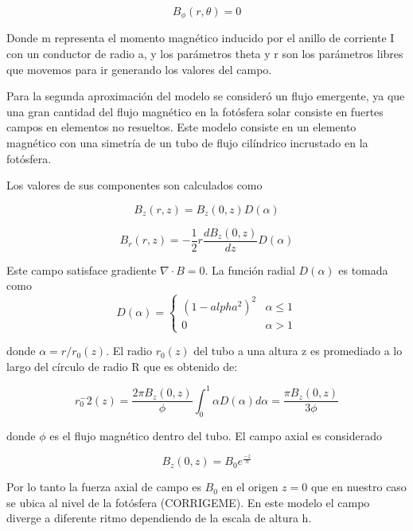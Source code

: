 \documentclass[9pt]{book}
\begin{document}
\begin{equation}
    B_\phi(r,\theta)=0
\end{equation}

Donde m representa el momento magn\'etico inducido por el anillo de corriente I con un conductor de radio a, y los par\'ametros theta y r son los par\'ametros libres que movemos para ir generando los valores del campo.

Para la segunda aproximaci\'on del modelo se consider\'o un flujo emergente, ya que una gran cantidad del flujo magn\'etico en la fot\'osfera solar consiste en fuertes campos en elementos no resueltos. Este modelo consiste en un elemento magn\'etico con una simetr\'ia de un tubo de flujo cil\'indrico incrustado en la fot\'osfera.

Los valores de sus componentes son calculados como

\begin{equation}
B_z(r,z)=B_z(0,z)D(\alpha)
\end{equation}

\begin{equation}
B_r(r,z)=-\frac{1}{2}r\frac{dB_z(0,z)}{dz}D(\alpha)
\end{equation}

Este campo satisface gradiente $ \nabla \cdot B = 0 $. La funci\'on radial $D(\alpha)$ es tomada como
\begin{equation}
 D(\alpha) = 
    \begin{cases}
        (1-alpha^2)^2 & \alpha \leq 1 \\
        0   & \alpha > 1
    \end{cases}
\end{equation}

donde $\alpha = r/r_0(z)$. El radio $r_0(z)$ del tubo a una altura z es promediado a lo largo del c\'irculo de radio R que es obtenido de:

\begin{equation} \label{r_flujo_emergente}
r_0^-2(z) = \frac{2\pi B_z(0,z)}{\phi} \int_{0}^{1} \alpha D(\alpha) d\alpha = \frac{\pi B_z(0,z)}{3 \phi}
\end{equation}

donde $\phi$ es el flujo magn\'etico dentro del tubo.
El campo axial es considerado

\begin{equation}
B_z(0,z)=B_0e^{\frac{-z}{h}}
\end{equation}

Por lo tanto la fuerza axial de campo es $B_0$ en el origen $z=0$ que en nuestro caso se ubica al nivel de la fot\'osfera (CORRIGEME). En este modelo el campo diverge a diferente ritmo dependiendo de la escala de altura h.
\end{document}
